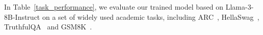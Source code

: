 In Table~\ref{task_performance}, we evaluate our trained model based on Llama-3-8B-Instruct on a set of widely used academic tasks, including ARC~\cite{clark2018thinksolvedquestionanswering}, HellaSwag~\cite{zellers-etal-2019-hellaswag}, TruthfulQA~\cite{lin-etal-2022-truthfulqa} and GSM8K~\cite{cobbe2021trainingverifierssolvemath}.




 









